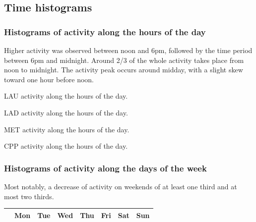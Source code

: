 \documentclass[%
 aip,
 jmp,%
 amsmath,amssymb,
 reprint,%
 floatfix,
]{revtex4-1}
\begin{document}
\FloatBarrier
\subsection{Time histograms}
\subsubsection{Histograms of activity along the hours of the day}\label{si:hours}

Higher activity was observed between noon and 6pm, followed by the time period between 6pm and midnight.
Around 2/3 of the whole activity takes place from noon to midnight.
The activity peak occurs around midday, with a slight skew toward one hour before noon.
\begin{table}[!h]
	\caption{LAU activity along the hours of the day.}
	\footnotesize
	
\end{table}

\begin{table}[!h]
	\caption{LAD activity along the hours of the day.}
	\footnotesize
	
\end{table}

\begin{table}[!h]
	\caption{MET activity along the hours of the day.}
	\footnotesize
	
\end{table}

\begin{table}[!h]
	\caption{CPP activity along the hours of the day.}
	\footnotesize
	
\end{table}

\FloatBarrier

\subsubsection{Histograms of activity along the days of the week}
Most notably, a decrease of activity on weekends of at least one third and at most two thirds.

\begin{table}[!h]
\begin{center}
    \begin{tabular}{ | l |  c | c | c | c | c |   c | c |}
        \hline
        & Mon & Tue & Wed & Thu & Fri & Sat & Sun  \\ \hline
	
    \end{tabular}
\end{center}
\label{tab:win}
\end{table}
\end{document}
